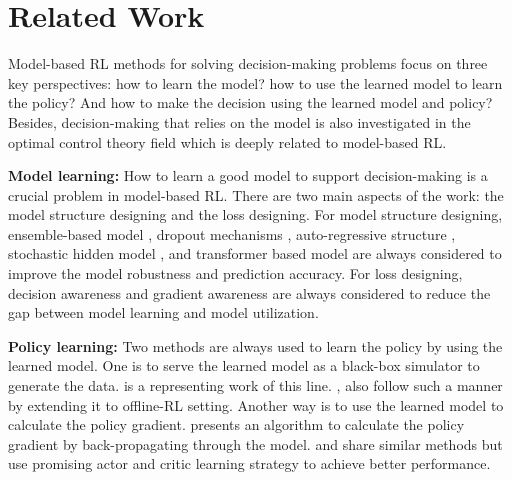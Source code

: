 \documentclass{article} %
\newcommand{\yue}[1]{ {#1}}
\begin{document}
\newpage

\appendix
 

\section{Related Work}
\label{sec:related work}
Model-based RL methods for solving decision-making problems focus on three key perspectives: how to learn the model? how to use the learned model to learn the policy? And how to make the decision using the learned model and policy? 
Besides, decision-making that relies on the model is also investigated in the optimal control theory field which is deeply related to model-based RL. 


\textbf{Model learning:} How to learn a good model to support decision-making is a crucial problem in model-based RL. There are two main aspects of the work: the model structure designing and the loss designing.
For model structure designing, ensemble-based model \citep{chua_deep_2018}, dropout mechanisms \citep{zhang_importance_2021}, auto-regressive structure \citep{zhang2020autoregressive}, stochastic hidden model \citep{hafner2021mastering}, and transformer based model \citep{chen2022transdreamer} are always considered to improve the model robustness and prediction accuracy. For loss designing, \yue{decision awareness \citep{doro_gradient-aware_2020,farahmand_value-aware_2017} and gradient awareness \citep{li2021gradient} }are always considered to reduce the gap between model learning and model utilization. 

\textbf{Policy learning:} 
Two methods are always used to learn the policy by using the learned model. One is to serve the learned model as a black-box simulator to generate the data. \cite{janner_when_2019} is a representing work of this line. \cite{yu2020mopo}, \cite{lee2020representation}   also follow such a manner by extending it to offline-RL setting. Another way is to use the learned model to calculate the policy gradient. \cite{heess_learning_2015} presents an algorithm to calculate the policy gradient by back-propagating through the model. \cite{clavera_model-augmented_2019} and \cite{amos_model-based_2021} share similar methods but use promising actor and critic learning strategy to achieve better performance.
\end{document}
